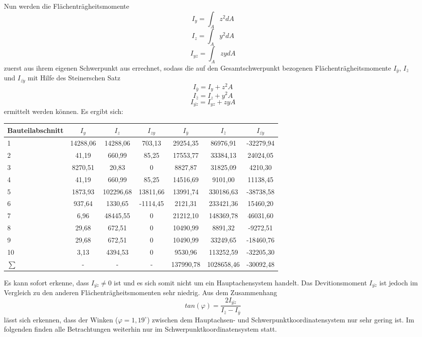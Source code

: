 Nun werden die Flächenträgheitsmomente 
\begin{equation}
	I_{y} = \int_{A}^{}z^2dA
\end{equation}
\begin{equation}
I_{z} = \int_{A}^{}y^2dA
\end{equation}
\begin{equation}
I_{yz} = \int_{A}^{}zydA
\end{equation}
 zuerst aus ihrem eigenen Schwerpunkt aus errechnet, sodass die auf den Gesamtschwerpunkt bezogenen Flächenträgheitsmomente $I_{\bar{y}}$, $I_{\bar{z}}$ und $I_{\bar{zy}}$ mit Hilfe des Steinerschen Satz
 \begin{equation}
 	I_{\bar{y}} = I_{y} + z^2A
 \end{equation}
\begin{equation}
I_{\bar{z}} = I_{z} + y^2A
\end{equation}
\begin{equation}
I_{\bar{yz}} = I_{yz} + zyA
\end{equation}
 ermittelt werden können.
Es ergibt sich:
\begin{center}

\begin{tabular}[h]{l|c|c|c||c|c|c}
Bauteilabschnitt&$I_{y}$&$I_{z}$&$I_{zy}$&$I_{\bar{y}}$&$I_{\bar{z}}$&$I_{\bar{zy}}$\\
\hline
1&14288,06&14288,06&703,13&29254,35&86976,91&-32279,94\\
2&41,19&660,99&85,25&17553,77&33384,13&24024,05\\
3&8270,51&20,83&0&8827,87&31825,09&4210,30\\
4&41,19&660,99&85,25&14516,69&9101,00&11138,45\\
5&1873,93&102296,68&13811,66&13991,74&330186,63&-38738,58\\
6&937,64&1330,65&-1114,45&2121,31&233421,36&15460,20\\
7&6,96&48445,55&0&21212,10&148369,78&46031,60\\
8&29,68&672,51&0&10490,99&8891,32&-9272,51\\
9&29,68&672,51&0&10490,99&33249,65&-18460,76\\
10&3,13&4394,53&0&9530,96&113252,59&-32205,30\\
\hline
$\sum{}$&-&-&-&137990,78&1028658,46&-30092,48
\end{tabular}
\end{center}
Es kann sofort erkenne, dass $I_{\bar{yz}} \neq 0$ ist und es sich somit nicht um ein Hauptachensystem handelt. Das Devitionsmoment  $I_{\bar{yz}}$ ist jedoch im Vergleich zu den anderen Flächenträgheitsmomenten sehr niedrig. 
Aus dem Zusammenhang
\begin{equation}
	tan(\varphi)=\frac{2I_{\bar{yz}}}{I_{\bar{z}}-I_{\bar{y}}}
\end{equation}
lässt sich erkennen, dass der Winken ($\varphi =1,19^\circ$) zwischen dem Hauptachsen- und Schwerpunktkoordinatensystem nur sehr gering ist. Im folgenden finden alle Betrachtungen weiterhin nur im Schwerpunktkoordinatensystem statt.

